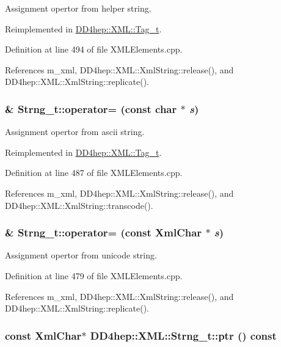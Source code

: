 Assignment opertor from helper string. 

Reimplemented in \hyperlink{class_d_d4hep_1_1_x_m_l_1_1_tag__t_a1869e32e13504b08283ca87cfc1ad82a}{DD4hep::XML::Tag\_\-t}.

Definition at line 494 of file XMLElements.cpp.

References m\_\-xml, DD4hep::XML::XmlString::release(), and DD4hep::XML::XmlString::replicate().\hypertarget{class_d_d4hep_1_1_x_m_l_1_1_strng__t_a787c32e2ab4f24fff13bb8b9a059ca3c}{
\subsubsection[{operator=}]{ \& Strng\_\-t::operator= (const char $\ast$ {\em s})}}
\label{class_d_d4hep_1_1_x_m_l_1_1_strng__t_a787c32e2ab4f24fff13bb8b9a059ca3c}


Assignment opertor from ascii string. 

Reimplemented in \hyperlink{class_d_d4hep_1_1_x_m_l_1_1_tag__t_a170961001c2a13473b9258cd92a27faf}{DD4hep::XML::Tag\_\-t}.

Definition at line 487 of file XMLElements.cpp.

References m\_\-xml, DD4hep::XML::XmlString::release(), and DD4hep::XML::XmlString::transcode().\hypertarget{class_d_d4hep_1_1_x_m_l_1_1_strng__t_a9d28b473f29f5cb66de040207fd38e54}{
\subsubsection[{operator=}]{ \& Strng\_\-t::operator= (const {\bf XmlChar} $\ast$ {\em s})}}
\label{class_d_d4hep_1_1_x_m_l_1_1_strng__t_a9d28b473f29f5cb66de040207fd38e54}


Assignment opertor from unicode string. 

Definition at line 479 of file XMLElements.cpp.

References m\_\-xml, DD4hep::XML::XmlString::release(), and DD4hep::XML::XmlString::replicate().\hypertarget{class_d_d4hep_1_1_x_m_l_1_1_strng__t_a41b088ad8a4ff8230158f3d529066262}{
\subsubsection[{ptr}]{\setlength{\rightskip}{0pt plus 5cm}const {\bf XmlChar}$\ast$ DD4hep::XML::Strng\_\-t::ptr () const}}
\label{class_d_d4hep_1_1_x_m_l_1_1_strng__t_a41b088ad8a4ff8230158f3d529066262}


